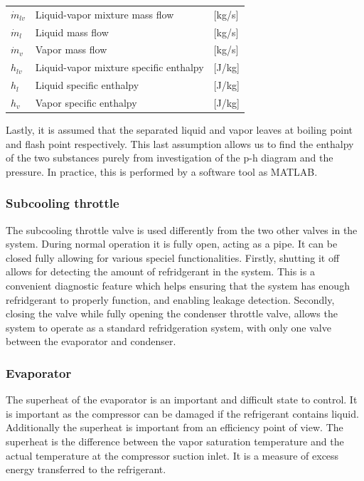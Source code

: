 \begin{center}
	\begin{tabular}{l p{8cm} l}
		$\dot{m}_{lv}$			&  Liquid-vapor mixture mass flow			& [\si{kg}/\si{s}]\\
		$\dot{m}_{l}$			&  Liquid mass flow 						& [\si{kg}/\si{s}] \\
		$\dot{m}_{v}$			&  Vapor mass flow							& [\si{kg}/\si{s}]\\
		$h_{lv}$				&  Liquid-vapor mixture specific enthalpy	& [\si{J}/\si{kg}]\\
		$h_{l}$					&  Liquid specific enthalpy 				& [\si{J}/\si{kg}] \\
		$h_{v}$					&  Vapor specific enthalpy					& [\si{J}/\si{kg}]\\
		
	\end{tabular}
\end{center}


Lastly, it is assumed that the separated liquid and vapor leaves at boiling point and flash point respectively. This last assumption allows us to find the enthalpy of the two substances purely from investigation of the p-h diagram and the pressure. In practice, this is performed by a software tool as MATLAB.

\subsubsection{Subcooling throttle}
The subcooling throttle valve is used differently from the two other valves in the system. During normal operation it is fully open, acting as a pipe. It can be closed fully allowing for various speciel functionalities. Firstly, shutting it off allows for detecting the amount of refridgerant in the system. This is a convenient diagnostic feature which helps ensuring that the system has enough refridgerant to properly function, and enabling leakage detection. Secondly, closing the valve while fully opening the condenser throttle valve, allows the system to operate as a standard refridgeration system, with only one valve between the evaporator and condenser.

\subsubsection{Evaporator}
The superheat of the evaporator is an important and difficult state to control. It is important as the compressor can be damaged if the refrigerant contains liquid. Additionally the superheat is important from an efficiency point of view. 
The superheat is the difference between the vapor saturation temperature and the actual temperature at the compressor suction inlet. It is a measure of excess energy transferred to the refrigerant. 


